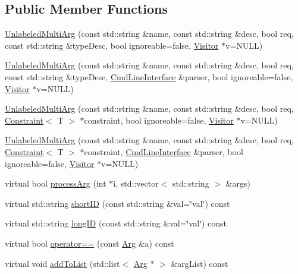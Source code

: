 \subsection*{Public Member Functions}
\begin{DoxyCompactItemize}
\item 
\hyperlink{class_t_c_l_a_p_1_1_unlabeled_multi_arg_a776c124bf343d0ecfb73e7cc28423807}{Unlabeled\+Multi\+Arg} (const std\+::string \&name, const std\+::string \&desc, bool req, const std\+::string \&type\+Desc, bool ignoreable=false, \hyperlink{class_t_c_l_a_p_1_1_visitor}{Visitor} $\ast$v=N\+U\+L\+L)
\item 
\hyperlink{class_t_c_l_a_p_1_1_unlabeled_multi_arg_a5c81005897f6b9673b39f5d1107f4074}{Unlabeled\+Multi\+Arg} (const std\+::string \&name, const std\+::string \&desc, bool req, const std\+::string \&type\+Desc, \hyperlink{class_t_c_l_a_p_1_1_cmd_line_interface}{Cmd\+Line\+Interface} \&parser, bool ignoreable=false, \hyperlink{class_t_c_l_a_p_1_1_visitor}{Visitor} $\ast$v=N\+U\+L\+L)
\item 
\hyperlink{class_t_c_l_a_p_1_1_unlabeled_multi_arg_aa065c76cd23b4acfe62c4b31d73dcf87}{Unlabeled\+Multi\+Arg} (const std\+::string \&name, const std\+::string \&desc, bool req, \hyperlink{class_t_c_l_a_p_1_1_constraint}{Constraint}$<$ T $>$ $\ast$constraint, bool ignoreable=false, \hyperlink{class_t_c_l_a_p_1_1_visitor}{Visitor} $\ast$v=N\+U\+L\+L)
\item 
\hyperlink{class_t_c_l_a_p_1_1_unlabeled_multi_arg_ad3d8c37cd3c71deb2275b48115a59f11}{Unlabeled\+Multi\+Arg} (const std\+::string \&name, const std\+::string \&desc, bool req, \hyperlink{class_t_c_l_a_p_1_1_constraint}{Constraint}$<$ T $>$ $\ast$constraint, \hyperlink{class_t_c_l_a_p_1_1_cmd_line_interface}{Cmd\+Line\+Interface} \&parser, bool ignoreable=false, \hyperlink{class_t_c_l_a_p_1_1_visitor}{Visitor} $\ast$v=N\+U\+L\+L)
\item 
virtual bool \hyperlink{class_t_c_l_a_p_1_1_unlabeled_multi_arg_aa5a35665519518dcb60e53d3a4858802}{process\+Arg} (int $\ast$i, std\+::vector$<$ std\+::string $>$ \&args)
\item 
virtual std\+::string \hyperlink{class_t_c_l_a_p_1_1_unlabeled_multi_arg_a5971af8f29fa4d798ffde3293504c15b}{short\+I\+D} (const std\+::string \&val=\char`\"{}val\char`\"{}) const 
\item 
virtual std\+::string \hyperlink{class_t_c_l_a_p_1_1_unlabeled_multi_arg_a1e7262967b850fb30e1003890a45f1ca}{long\+I\+D} (const std\+::string \&val=\char`\"{}val\char`\"{}) const 
\item 
virtual bool \hyperlink{class_t_c_l_a_p_1_1_unlabeled_multi_arg_a059fa00203a9f643a10334fedbd43e39}{operator==} (const \hyperlink{class_t_c_l_a_p_1_1_arg}{Arg} \&a) const 
\item 
virtual void \hyperlink{class_t_c_l_a_p_1_1_unlabeled_multi_arg_a290b15792de11abb5a4cf1c312d6a0d7}{add\+To\+List} (std\+::list$<$ \hyperlink{class_t_c_l_a_p_1_1_arg}{Arg} $\ast$ $>$ \&arg\+List) const 
\end{DoxyCompactItemize}
